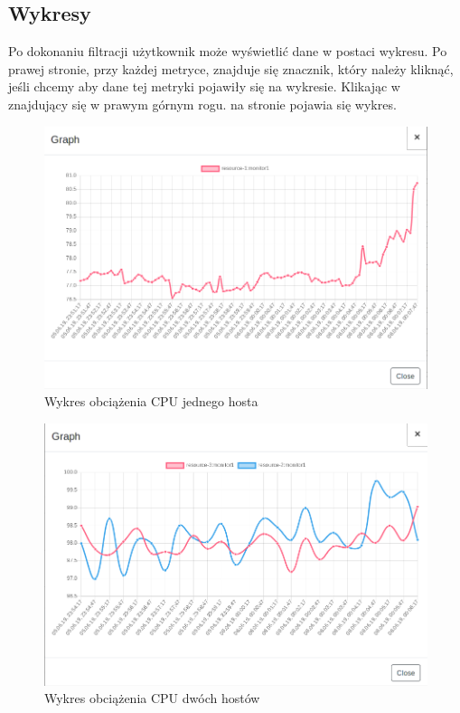 \documentclass{article}
\begin{document}
\subsection{Wykresy}
Po dokonaniu filtracji użytkownik może wyświetlić dane w postaci wykresu. Po prawej stronie, przy każdej metryce, znajduje się znacznik, który należy kliknąć, jeśli chcemy aby dane tej metryki pojawiły się na wykresie. Klikając w  znajdujący się w prawym górnym rogu.  na stronie pojawia się wykres.
\begin{figure}[h]
\includegraphics[scale=0.35]{../screen/Wykres.png}
\centering
\caption{Wykres obciążenia CPU jednego hosta}
\end{figure}
\begin{figure}[h]
\includegraphics[scale=0.35]{../screen/Wykres2.png}
\centering
\caption{Wykres obciążenia CPU dwóch hostów}
\end{figure}
\end{document}
